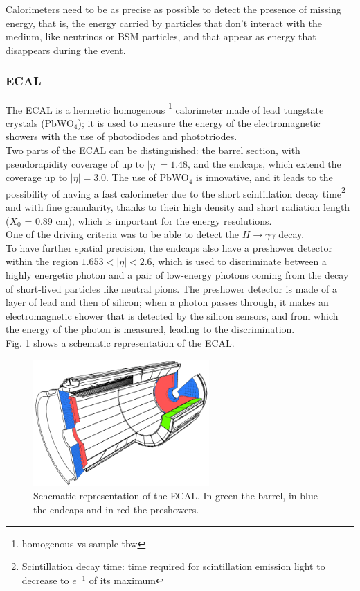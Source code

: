 Calorimeters need to be as precise as possible to detect the presence of missing energy, that is, the energy carried by particles that don't interact with the medium, like neutrinos or BSM particles, and that appear as energy that disappears during the event.
\subsubsection{ECAL}
The ECAL is a hermetic homogenous \footnote{homogenous vs sample tbw} calorimeter made of lead tungstate crystals (PbWO$_4$); it is used to measure the energy of the electromagnetic showers with the use of photodiodes and phototriodes.\\
Two parts of the ECAL can be distinguished: the barrel section, with pseudorapidity coverage of up to $|\eta|= 1.48$, and the endcaps, which extend the coverage up to $|\eta| = 3.0$.
The use of PbWO$_4$ is innovative, and it leads to the possibility of having a fast calorimeter due to the short scintillation decay time\footnote{Scintillation decay time: time required for scintillation emission light to decrease to $e^{-1}$ of its maximum} and with fine granularity, thanks to their high density and short radiation length ($X_0$ = 0.89 cm), which is important for the energy resolutions.\\
One of the driving criteria was to be able to detect the $H\longrightarrow\gamma\gamma$ decay.\\
To have further spatial precision, the endcaps also have a preshower detector within the region $1.653 < |\eta|< 2.6$, which is used to discriminate between a highly energetic photon and a pair of low-energy photons coming from the decay of short-lived particles like neutral pions. The preshower detector is made of a layer of lead and then of silicon; when a photon passes through, it makes an electromagnetic shower that is detected by the silicon sensors, and from which the energy of the photon is measured, leading to the discrimination.\\
Fig. \ref{ecal} shows a schematic representation of the ECAL.
\begin{figure}[h]
    \centering
    \includegraphics[width = 0.6\textwidth]{images/ecal.png}
    \caption{Schematic representation of the ECAL. In green the barrel, in blue the endcaps and in red the preshowers.}
    \label{ecal}
\end{figure}
